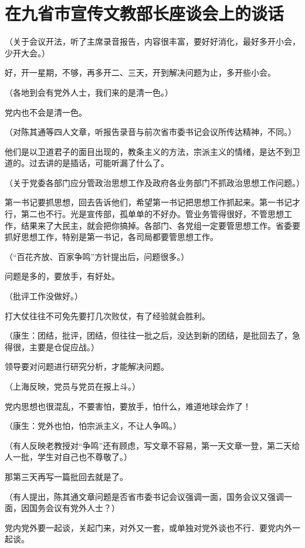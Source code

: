 \section[在九省市宣传文教部长座谈会上的谈话（一九五七年三月六日）]{在九省市宣传文教部长座谈会上的谈话}


（关于会议开法，听了主席录音报告，内容很丰富，要好好消化，最好多开小会，少开大会。）

好，开一星期，不够，再多开二、三天，开到解决问题为止，多开些小会。

（各地到会有党外人士，我们来的是清一色。）

党内也不会是清一色。

（对陈其通等四人文章，听报告录音与前次省市委书记会议所传达精神，不同。）

他们是以卫道君子的面目出现的，教条主义的方法，宗派主义的情绪，是达不到卫道的。过去讲的是插话，可能听漏了什么了。

（关于党委各部门应分管政治思想工作及政府各业务部门不抓政治思想工作问题。）

第一书记要抓思想，回去告诉他们，希望第一书记把思想工作抓起来。第一书记才行，第二也不行。光是宣传部，孤单单的不好办。管业务管得很好，不管思想工作，结果来了大民主，就会把你搞掉。各部门、各党组一定要管思想工作。省委要抓好思想工作，特别是第一书记，各司局都要管思想工作。

（“百花齐放、百家争鸣”方针提出后，问题很多。）

问题是多的，要放手，有好处。

（批评工作没做好。）

打大仗往往不可免先要打几次败仗，有了经验就会胜利。

（康生：团结，批评，团结，但往往一批之后，没达到新的团结，是批回去了，急得很，主要是仓促应战。）

领导要对问题进行研究分析，才能解决问题。

（上海反映，党员与党员在报上斗。）

党内思想也很混乱，不要害怕，要放手，怕什么，难道地球会炸了！

（康生：党外也怕，怕宗派主义，不让人争鸣。）

（有人反映老教授对“争鸣”还有顾虑，写文章不容易，第一天文章一登，第二天给人一批，学生对自己也不尊敬了。）

那第三天再写一篇批回去就是了。

（有人提出，陈其通文章问题是否省市委书记会议强调一面，国务会议又强调一面，因国务会议有党外人士？）

党内党外要一起谈，关起门来，对外又一套，或单独对党外谈也不行．要党内外一起谈。

